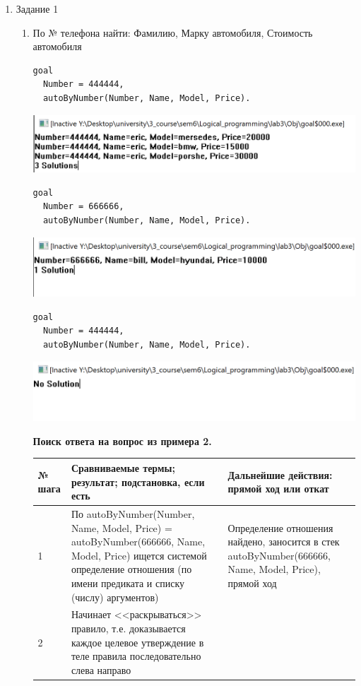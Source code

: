 \documentclass[a4paper,14pt]{extreport} %
\begin{document}
\begin{enumerate}
\item Задание 1
\begin{enumerate}
\item По № телефона найти: Фамилию, Марку автомобиля, Стоимость автомобиля


\begin{lstlisting}[caption=Пример 1 задание 1a]
goal
  Number = 444444,
  autoByNumber(Number, Name, Model, Price).
\end{lstlisting}

\includegraphics[scale=0.8]{ex1}

\begin{lstlisting}[caption=Пример 2 задание 1a]
goal
  Number = 666666,
  autoByNumber(Number, Name, Model, Price).
\end{lstlisting}

\includegraphics[scale=0.8]{ex2}


\begin{lstlisting}[caption=Пример 3 задание 1a]
goal
  Number = 444444,
  autoByNumber(Number, Name, Model, Price).
\end{lstlisting}

\includegraphics[scale=0.8]{ex3}

\textbf{Поиск ответа на вопрос из примера 2. }

\begin{longtable}{|p{1.1cm}|p{8.5cm}|p{7cm}|}
	\hline
 	№ шага & Сравниваемые термы; результат; подстановка, если есть  & Дальнейшие действия: прямой ход или откат \\ \hline
	1 & По autoByNumber(Number, Name, Model, Price) = autoByNumber(666666, Name, Model, Price) ищется системой определение отношения (по имени предиката и списку (числу) аргументов) & Определение отношения найдено, заносится в стек autoByNumber(666666, Name, Model, Price), прямой ход \\ \hline
	2 & Начинает <<раскрываться>> правило, т.е. доказывается каждое целевое утверждение в теле правила последовательно слева направо
	

\end{longtable}
\end{enumerate}
\end{enumerate}
\end{document}
